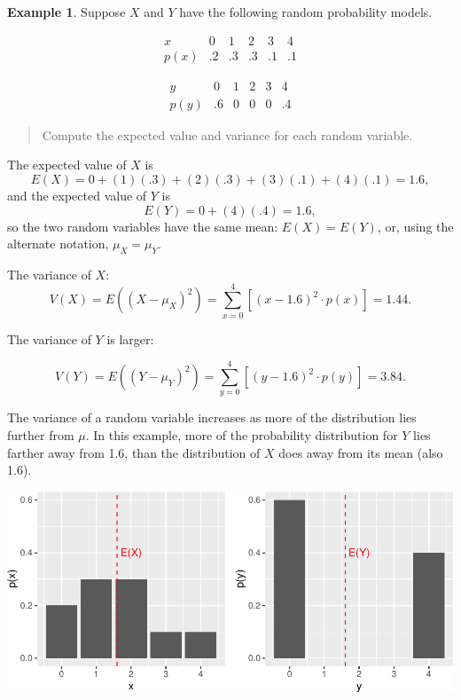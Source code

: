 \documentclass[
]{book}
\theoremstyle{definition}
\theoremstyle{definition}
\newtheorem{example}{Example}[chapter]
\theoremstyle{definition}
\theoremstyle{definition}
\theoremstyle{remark}
\begin{document}
\begin{example}
\protect\hypertarget{exm:variance-comparison}{}\label{exm:variance-comparison}Suppose \(X\) and \(Y\) have the following random probability models.

\[
\begin{array}{c|c|c|c|c|c}
x & 0 & 1 & 2 & 3 & 4 \\ \hline
p(x) & .2 & .3 & .3 & .1 & .1
\end{array}
\]

\[
\begin{array}{c|c|c|c|c|c}
y & 0 & 1 & 2 & 3 & 4\\ \hline
p(y) & .6 & 0 & 0 & 0 & .4 
\end{array}
\]

\begin{quote}
Compute the expected value and variance for each random variable.
\end{quote}

The expected value of \(X\) is \[E(X) = 0 + (1)(.3) + (2)(.3) + (3)(.1) + (4)(.1) = 1.6,\] and the expected value of \(Y\) is \[E(Y) = 0 + (4)(.4) = 1.6,\]
so the two random variables have the same mean: \(E(X) = E(Y)\), or, using the alternate notation, \(\mu_X = \mu_Y\).

The variance of \(X\): \[V(X) = E((X-\mu_X)^2) = \sum_{x = 0}^4[(x-1.6)^2\cdot p(x)]= 1.44.\]

The variance of \(Y\) is larger:

\[V(Y) = E((Y-\mu_Y)^2) = \sum_{y = 0}^4[(y-1.6)^2\cdot p(y)]= 3.84.\]

The variance of a random variable increases as more of the distribution lies further from \(\mu\). In this example, more of the probability distribution for \(Y\) lies farther away from 1.6, than the distribution of \(X\) does away from its mean (also 1.6).

\includegraphics{math340-notes_files/figure-latex/unnamed-chunk-12-1.pdf}
\end{example}
\end{document}
